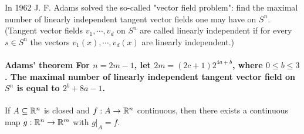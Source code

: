 In 1962 J. F. Adams solved the so-called "vector field problem": find the maximal
number of linearly independent tangent vector fields one may have on $S^n$.
(Tangent vector fields $v_1,\cdots,v_d$ on $S^n$ are called linearly independent if for every
$s\in S^n$ the vectors $v_1(x),\cdots,v_d(x)$ are linearly independent.)

\paragraph{\textbf{Adams' theorem}\label{adams-theorem}
  For $n=2m-1$, let $2m=(2c+1)2^{4a+b}$, where $0\le b\le 3$. The maximal number of linearly independent 
  tangent vector field on $S^n$ is equal to $2^b+8a-1$.
}

\begin{lemma}\label{lemma:7-4}
  If $A\subseteq \mathbb{R}^n$ is closed and $f:A\to\mathbb{R}^n$ continuous, then there exists a continuous map 
  $g:\mathbb{R}^n\to\mathbb{R}^m$ with $g|_A = f$.
\end{lemma}

